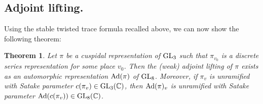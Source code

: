 \documentclass[11pt]{amsart}
\theoremstyle{plain}
\newtheorem{thm}[equation]{Theorem}
\numberwithin{equation}{section}
\newcommand{\C}{\mathbb C}
\def\GL{{\rm GL}}
\def\C{{\bf C}}
\def\C{{\mathbb C}}
\begin{document}
 
  
  \vskip 10pt
  
   



\vskip 5pt

\subsection{\bf Adjoint lifting.}
Using the stable twisted trace formula recalled above, we can now show the following theorem:
\vskip 5pt

\begin{thm} \label{T:main lifting}
Let  $\pi$ be a cuspidal representation of $\GL_3$ such that $\pi_{v_0}$ is a discrete series representation for some place $v_0$. Then the (weak) adjoint lifting of $\pi$ exists as an automorphic representation ${\rm Ad}(\pi)$ of  $\GL_8$. Moreover, if $\pi_v$ is unramified with Satake parameter $c(\pi_v) \in \GL_3(\C)$, then ${\rm Ad}(\pi)_v$ is unramified with Satake parameter ${\rm Ad}(c(\pi_v)) \in \GL_8(\C)$.
\end{thm}
\vskip 5pt
\end{document}
